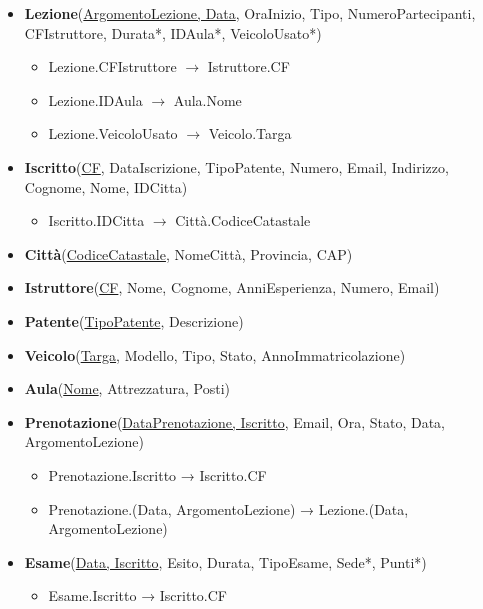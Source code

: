 \documentclass[10pt,twoside]{article}
\begin{document}
{{        \begin{itemize}
            \item \textbf{Lezione}(\underline{ArgomentoLezione, Data}, OraInizio, Tipo, NumeroPartecipanti, CFIstruttore, Durata*, IDAula*, VeicoloUsato*)
            \begin{itemize}
                \item Lezione.CFIstruttore  $\rightarrow$ Istruttore.CF
                \item Lezione.IDAula  $\rightarrow$ Aula.Nome
                \item Lezione.VeicoloUsato $\rightarrow$ Veicolo.Targa
            \end{itemize}
            \item \textbf{Iscritto}(\underline{CF}, DataIscrizione, TipoPatente, Numero, Email, Indirizzo, Cognome, Nome, IDCitta)
            \begin{itemize}
                \item Iscritto.IDCitta $\rightarrow$ Città.CodiceCatastale
            \end{itemize}
            \item \textbf{Città}(\underline{CodiceCatastale}, NomeCittà, Provincia, CAP)
            \item \textbf{Istruttore}(\underline{CF}, Nome, Cognome, AnniEsperienza, Numero, Email)
            \item \textbf{Patente}(\underline{TipoPatente}, Descrizione)
            \item \textbf{Veicolo}(\underline{Targa}, Modello, Tipo, Stato, AnnoImmatricolazione)
            \item \textbf{Aula}(\underline{Nome}, Attrezzatura, Posti)
            \item \textbf{Prenotazione}(\underline{DataPrenotazione, Iscritto}, Email, Ora, Stato, Data, ArgomentoLezione)
            \begin{itemize}
                \item Prenotazione.Iscritto → Iscritto.CF
                \item Prenotazione.(Data, ArgomentoLezione) → Lezione.(Data, ArgomentoLezione)
            \end{itemize}
            \item \textbf{Esame}(\underline{Data, Iscritto}, Esito, Durata, TipoEsame, Sede*, Punti*)
            \begin{itemize}
                \item Esame.Iscritto → Iscritto.CF

\end{itemize}
\end{itemize}}}
\end{document}
